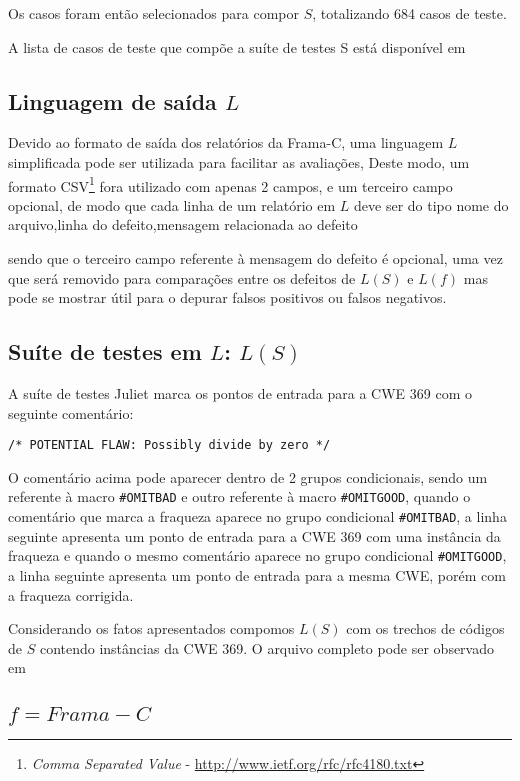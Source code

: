   Os casos foram então selecionados para compor $S$, totalizando 684 casos de teste.

  A lista de casos de teste que compõe a suíte de testes S está disponível em 

  \subsection{Linguagem de saída $L$}

  Devido ao formato de saída dos relatórios da Frama-C, uma linguagem $L$ simplificada pode ser utilizada para facilitar as avaliações, Deste modo, um formato CSV\footnote{\textit{Comma Separated Value} - \url{http://www.ietf.org/rfc/rfc4180.txt}} fora utilizado com apenas 2 campos, e um terceiro campo opcional, de modo que cada linha de um relatório em $L$ deve ser do tipo
  nome do arquivo,linha do defeito,mensagem relacionada ao defeito

  sendo que o terceiro campo referente à mensagem do defeito é opcional, uma vez que será removido para comparações entre os defeitos de $L(S)$ e $L(f)$ mas pode se mostrar útil para o depurar falsos positivos ou falsos negativos.

  \subsection{Suíte de testes em $L$: $L(S)$}

  A suíte de testes Juliet marca os pontos de entrada para a CWE 369 com o seguinte comentário:

  \lstinline{/* POTENTIAL FLAW: Possibly divide by zero */}

  O comentário acima pode aparecer dentro de 2 grupos condicionais, sendo um referente à macro \lstinline{#OMITBAD} e outro referente à macro \lstinline{#OMITGOOD}, quando o comentário que marca a fraqueza aparece no grupo condicional \lstinline{#OMITBAD}, a linha seguinte apresenta um ponto de entrada para a CWE 369 com uma instância da fraqueza e quando o mesmo comentário aparece no grupo condicional \lstinline{#OMITGOOD}, a linha seguinte apresenta um ponto de entrada para a mesma CWE, porém com a fraqueza corrigida.

  Considerando os fatos apresentados compomos $L(S)$ com os trechos de códigos de $S$ contendo instâncias da CWE 369. O arquivo completo pode ser observado em 

  \subsection{$f = Frama-C$}

